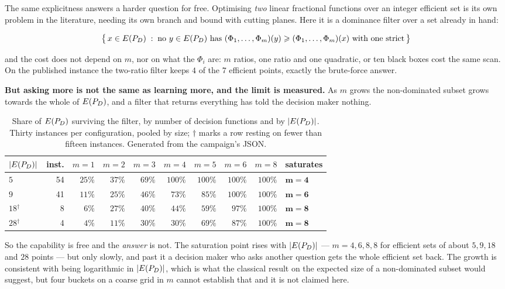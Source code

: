 \documentclass[11pt,a4paper]{article}
\begin{document}
The same explicitness answers a harder question for free.  Optimising
\emph{two} linear fractional functions over an integer efficient set is its own
problem in the literature, needing its own branch and bound with cutting
planes.  Here it is a dominance filter over a set already in hand:

\[
  \bigl\{\, x \in E(P_{D}) \;:\; \text{no } y \in E(P_{D}) \text{ has }
  (\Phi_1,\dots,\Phi_m)(y) \geqslant (\Phi_1,\dots,\Phi_m)(x)
  \text{ with one strict} \,\bigr\}
\]

\noindent
and the cost does not depend on $m$, nor on what the $\Phi_i$ are: $m$ ratios,
one ratio and one quadratic, or ten black boxes cost the same scan.  On the
published instance the two-ratio filter keeps $4$ of the $7$ efficient points,
exactly the brute-force answer.

\textbf{But asking more is not the same as learning more, and the limit is
measured.}  As $m$ grows the non-dominated subset grows towards the whole of
$E(P_{D})$, and a filter that returns everything has told the decision maker nothing.

\begin{table}[h]
\centering
\caption{Share of $E(P_{D})$ surviving the filter, by number of decision functions
and by $|E(P_{D})|$.  Thirty instances per configuration, pooled by size; $\dagger$
marks a row resting on fewer than fifteen instances.  Generated from the
campaign's JSON.}
\label{tab:filter}
\small
\begin{tabular}{lrrrrrrrrl}
\toprule
$|E(P_{D})|$ & inst. & $m{=}1$ & $m{=}2$ & $m{=}3$ & $m{=}4$ & $m{=}5$ & $m{=}6$ &
$m{=}8$ & saturates \\
\midrule
$5$ & 54 & $25\%$ & $37\%$ & $69\%$ & $100\%$ & $100\%$ & $100\%$ & $100\%$ & $\mathbf{m=4}$ \\
$9$ & 41 & $11\%$ & $25\%$ & $46\%$ & $73\%$ & $85\%$ & $100\%$ & $100\%$ & $\mathbf{m=6}$ \\
$18$$^{\dagger}$ & 8 & $6\%$ & $27\%$ & $40\%$ & $44\%$ & $59\%$ & $97\%$ & $100\%$ & $\mathbf{m=8}$ \\
$28$$^{\dagger}$ & 4 & $4\%$ & $11\%$ & $30\%$ & $30\%$ & $69\%$ & $87\%$ & $100\%$ & $\mathbf{m=8}$ \\
\bottomrule
\end{tabular}
\end{table}

\noindent
So the capability is free and the \emph{answer} is not.  The saturation point
rises with $|E(P_{D})|$ --- $m = 4, 6, 8, 8$ for efficient sets of about $5, 9, 18$
and $28$ points --- but only slowly, and past it a decision maker who asks
another question gets the whole efficient set back.  The growth is consistent
with being logarithmic in $|E(P_{D})|$, which is what the classical result on the
expected size of a non-dominated subset would suggest, but four buckets on a
coarse grid in $m$ cannot establish that and it is not claimed here.
\end{document}
